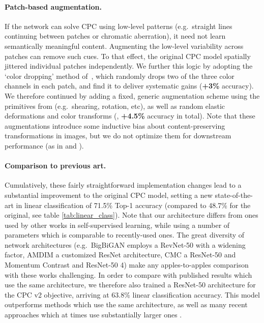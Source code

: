 \documentclass{article}
\begin{document}
\paragraph{Patch-based augmentation.} 
If the network can solve CPC using low-level patterns (e.g.\ straight lines continuing between patches or chromatic aberration), it need not learn semantically meaningful content. Augmenting the low-level variability across patches can remove such cues. To that effect, the original CPC model spatially jittered individual patches independently.  We further this logic by adopting the `color dropping' method of~\citet{doersch2015unsupervised}, which randomly drops two of the three color channels in each patch, and find it to deliver systematic gains (\textbf{+3\%} accuracy). We therefore continued by adding a fixed, generic augmentation scheme using the primitives from \citet{cubuk2018autoaugment} (e.g.\ shearing, rotation, etc), as well as random elastic deformations and color transforms (\citet{de2018clinically}, \textbf{+4.5\%} accuracy in total). Note that these augmentations introduce some inductive bias about content-preserving transformations in images, but we do not optimize them for downstream performance (as in \citet{cubuk2018autoaugment} and \citet{lim2019fast}).

\paragraph{Comparison to previous art.} Cumulatively, these fairly straightforward implementation changes lead to a substantial improvement to the original CPC model, setting a new state-of-the-art in linear classification of 71.5\% Top-1 accuracy (compared to 48.7\% for the original, see table \ref{tab:linear_class}). Note that our architecture differs from ones used by other works in self-supervised learning, while using a number of parameters which is comparable to recently-used ones. The great diversity of network architectures (e.g.\ BigBiGAN employs a RevNet-50 with a   widening factor, AMDIM a customized ResNet architecture, CMC a ResNet-50  and Momentum Contrast and ResNet-50 4) make any apples-to-apples comparison with these works challenging. In order to compare with published results which use the same architecture, we therefore also trained a ResNet-50 architecture for the CPC v2 objective, arriving at 63.8\% linear classification accuracy. This model outperforms methods which use the same architecture, as well as many recent approaches which at times use substantially larger ones \citep{doersch2017multi, oord2018representation, kolesnikov2019revisiting, zhuang2019local, donahue2019large}. 
\end{document}
